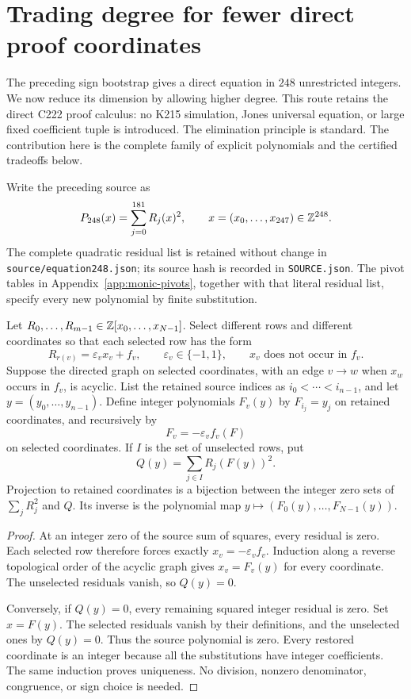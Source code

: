 \section{Trading degree for fewer direct proof coordinates}
\label{sec:monic-elimination}

The preceding sign bootstrap gives a direct equation in $248$ unrestricted
integers.  We now reduce its dimension by allowing higher degree.  This
route retains the direct C222 proof calculus: no K215 simulation, Jones
universal equation, or large fixed coefficient tuple is introduced.
The elimination principle is standard.  The contribution here is the
complete family of explicit polynomials and the certified tradeoffs below.

Write the preceding source as
\[
 P_{248}(x)=\sum_{j=0}^{181}R_j(x)^2,
 \qquad x=(x_0,\ldots,x_{247})\in\mathbb Z^{248}.
\]
The complete quadratic residual list is retained without change in
\texttt{source/equation248.json}; its source hash is recorded in
\texttt{SOURCE.json}.  The pivot tables in
Appendix~\ref{app:monic-pivots}, together with that literal residual list,
specify every new polynomial by finite substitution.

\begin{theorem}
\label{thm:acyclic-monic}
Let $R_0,\ldots,R_{m-1}\in\mathbb Z[x_0,\ldots,x_{N-1}]$.
Select different rows and different coordinates so that each selected row
has the form
\[
 R_{r(v)}=\varepsilon_v x_v+f_v,
 \qquad \varepsilon_v\in\{-1,1\},
 \qquad x_v\text{ does not occur in }f_v.
\]
Suppose the directed graph on selected coordinates, with an edge $v\to w$
when $x_w$ occurs in $f_v$, is acyclic.  List the retained source indices
as $i_0<\cdots<i_{n-1}$, and let $y=(y_0,\ldots,y_{n-1})$.
Define integer polynomials $F_v(y)$ by $F_{i_j}=y_j$ on retained
coordinates, and recursively by
\[
 F_v=-\varepsilon_v f_v(F)
\]
on selected coordinates.  If $I$ is the set of unselected rows, put
\[
 Q(y)=\sum_{j\in I}R_j(F(y))^2.
\]
Projection to retained coordinates is a bijection between the integer
zero sets of $\sum_jR_j^2$ and $Q$.  Its inverse is the polynomial map
$y\mapsto(F_0(y),\ldots,F_{N-1}(y))$.
\end{theorem}

\begin{proof}
At an integer zero of the source sum of squares, every residual is zero.
Each selected row therefore forces exactly
$x_v=-\varepsilon_v f_v$.  Induction along a reverse topological order of the
acyclic graph gives $x_v=F_v(y)$ for every coordinate.  The unselected
residuals vanish, so $Q(y)=0$.

Conversely, if $Q(y)=0$, every remaining squared integer residual is zero.
Set $x=F(y)$.  The selected residuals vanish by their definitions, and
the unselected ones by $Q(y)=0$.  Thus the source polynomial is zero.
Every restored coordinate is an integer because all the substitutions
have integer coefficients.  The same induction proves uniqueness.
No division, nonzero denominator, congruence, or sign choice is needed.
\end{proof}

